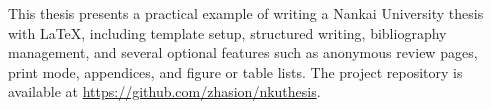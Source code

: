 
\begin{abstract}

本论文以“如何利用 \LaTeX 写一篇南开大学学位论文”为主题，围绕模板配置、正文写作、参考文献管理与常用可选功能，给出了一个面向南开大学学位论文写作的示例方案。模板尽量保持开箱即用，同时保留匿名评审、打印模式、附录、图表清单等常见需求的扩展能力。项目地址为 \url{https://github.com/zhasion/nkuthesis}。


\end{abstract}

\begin{abstract*}

This thesis presents a practical example of writing a Nankai University thesis with \LaTeX, including template setup, structured writing, bibliography management, and several optional features such as anonymous review pages, print mode, appendices, and figure or table lists. The project repository is available at \url{https://github.com/zhasion/nkuthesis}.


\end{abstract*}
